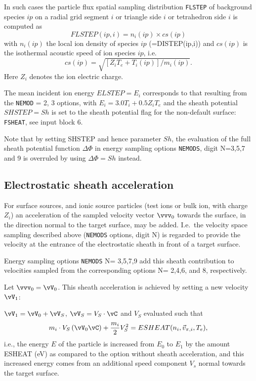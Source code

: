 In such cases the particle flux  spatial sampling distribution
\lstinline|FLSTEP| of background species $ip$ on a radial grid segment $i$
or triangle side $i$ or tetrahedron side $i$ is computed as
\begin{equation}
  FLSTEP(ip,i)=n_i(ip) \times cs(ip)
\end{equation}
with $n_i(ip)$ the local ion
density of species $ip$ (=DISTEP(ip,i)) and $cs(ip)$ is the isothermal acoustic
speed of ion species $ip$, i.e.
\begin{equation}
  cs(ip)=\sqrt{[Z_i
        T_e+T_i(ip)]/m_i(ip)}.
\end{equation}
Here $Z_i$ denotes the ion electric charge.

The mean incident ion energy $ELSTEP=E_i$ corresponds to that resulting from
the \lstinline|NEMOD| = 2, 3 options, with $E_i=3.0 T_i + 0.5 Z_i T_e$
and the sheath potential $SHSTEP= Sh$ is set to the sheath potential flag for
the non-default surface: \lstinline|FSHEAT|, see input block 6.

Note that by setting SHSTEP and hence parameter $Sh$, the evaluation of the
full sheath potential function $\Delta \Phi$ in energy sampling options
\lstinline|NEMODS|, digit N=3,5,7 and 9 is overruled by using $\Delta \Phi
  = Sh$ instead.

\subsection{Electrostatic sheath acceleration}
\label{sec2.7.2}

For surface sources, and ionic source particles (test ions or bulk ion, with
charge $Z_i$) an acceleration of the sampled velocity vector $\vvv_0$ towards
the surface, in the direction normal to the target surface, may be added.
I.e.\ the velocity space sampling described above (\lstinline|NEMODS|
options, digit N) is regarded to provide the velocity at the entrance of the
electrostatic sheath in front of a target surface.

Energy sampling options \lstinline|NEMODS| N= 3,5,7,9 add this sheath
contribution to velocities sampled from the corresponding options N= 2,4,6, and
8, respectively.

Let $\vvv_0=\vV_0$.
This sheath acceleration is achieved by setting a new velocity $\vV_1$:

${\vV}_1 = {\vV}_0   + {\vV}_S$, ${\vV}_S = V_S \cdot	\vC $ and $V_S$
evaluated such that
\begin{equation}
  m_i	 \cdot	  V_S \left ( {\vV}_0
  \vC \right )   +   \frac{m_i}{2} V_S^2 = ESHEAT(n_i,{\vec{v}}_{\pi,i},T_e),
\end{equation}
i.e., the energy $E$ of the particle is increased from $E_0$ to
$E_1$ by the amount ESHEAT (\si{\electronvolt}) as compared to the option
without sheath acceleration, and this increased energy comes from an additional
speed component $V_s$ normal towards the target surface.

